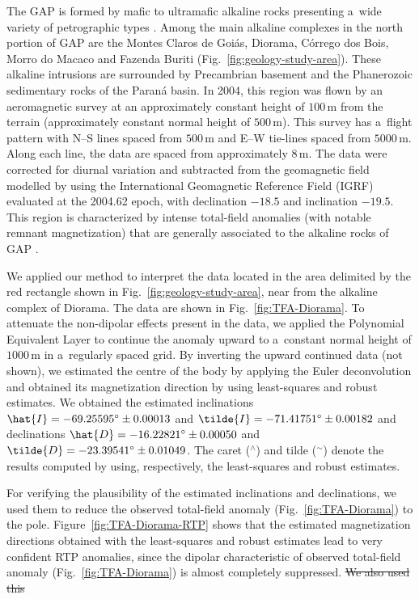 \documentclass[journal abbreviation, npg]{copernicus}
\providecommand{\DIFdel}[1]{{\protect\color{red}\sout{#1}}}                      %
\providecommand{\DIFaddbegin}{} %
\providecommand{\DIFdelbegin}{} %
\providecommand{\DIFdelend}{} %
\begin{document}
The GAP is formed by mafic to ultramafic alkaline rocks presenting a~wide
variety of petrographic types
\citep{almeida1983,junqueira-brod2005,carlson-etal2007,marangoni-mantovani2013}.
Among the main alkaline complexes in the north portion of GAP are the Montes
Claros de Goi\'{a}s, Diorama, C\'{o}rrego dos Bois, Morro do Macaco and
Fazenda Buriti (Fig.~\ref{fig:geology-study-area}). These alkaline intrusions
are surrounded by Precambrian basement and the Phanerozoic sedimentary rocks
of the Paran\'{a} basin. In 2004, this region was flown by an aeromagnetic
survey at an approximately constant height of $100$\,\unit{m} from the
terrain (approximately constant normal height of $500$\,\unit{m}). This
survey has a~flight pattern with N--S lines spaced from $500$\,\unit{m} and
E--W tie-lines spaced from $5000$\,\unit{m}. Along each line, the data are
spaced from approximately $8$\,\unit{m}. The data were corrected for diurnal
variation and subtracted from the geomagnetic field modelled by using the
International Geomagnetic Reference Field (IGRF) evaluated at the 2004.62
epoch, with declination $-18.5${\degree} and inclination $-19.5${\degree}.
This region is characterized by intense total-field anomalies (with notable
remnant magnetization) that are generally associated to the alkaline rocks of
GAP \citep{dutra-marangoni2009,dutra-etal2012,marangoni-mantovani2013}.

We applied our method to interpret the data located in the area delimited by
the red rectangle shown in Fig.~\ref{fig:geology-study-area}, near from the
alkaline complex of Diorama. The data are shown in
Fig.~\ref{fig:TFA-Diorama}. To attenuate the non-dipolar effects present in
the data, we applied the Polynomial Equivalent Layer
\citep{oliveirajr-etal2013} to continue the anomaly upward to a~constant
normal height of $1000$\,\unit{m} in a~regularly spaced grid. By inverting
the upward continued data (not shown), we estimated the centre of the body by
applying the Euler deconvolution and obtained its magnetization direction by
using least-squares and robust estimates. We obtained the estimated
inclinations $\hat{I} = -69.25595{\degree} \pm 0.00013${\degree} and
$\tilde{I} = -71.41751{\degree} \pm 0.00182${\degree} and declinations
$\hat{D} = -16.22821{\degree} \pm 0.00050${\degree} and $\tilde{D} =
-23.39541{\degree} \pm 0.01049${\degree}. The caret ($^{\wedge}$) and tilde
($^{\sim}$) denote the results computed by using, respectively, the
least-squares and robust estimates.

For verifying the plausibility of the estimated inclinations and
declinations, we used them to reduce the observed total-field anomaly
(Fig.~\ref{fig:TFA-Diorama}) to the pole. Figure~\ref{fig:TFA-Diorama-RTP}
shows that the estimated magnetization directions obtained with the
least-squares and robust estimates lead to very confident RTP anomalies,
since the dipolar characteristic of observed total-field anomaly
(Fig.~\ref{fig:TFA-Diorama}) is almost completely suppressed. 
\DIFdelbegin \DIFdel{We also used
this }\DIFdelend \DIFaddbegin 
\end{document}
